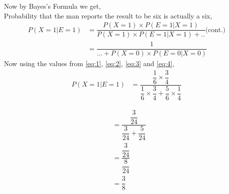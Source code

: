 \documentclass{beamer}
\begin{document}
\begin{frame}
Now by Bayes's Formula we get,\\
Probability that the man reports the result to be six is actually a six,\\
\begin{align}
P(X=1|E=1)&=\dfrac{P(X=1)\times P(E=1|X=1)}{P(X=1)\times P(E=1|X=1)+..}\text{(cont.)}\\
&=\dfrac{1}{...+P(X=0)\times P(E=0|X=0)}
\end{align}
Now using the values from \eqref{eq:1}, \eqref{eq:2}, \eqref{eq:3} and \eqref{eq:4},
\begin{align}
P(X=1|E=1)&=\dfrac{\dfrac{1}{6}\times \dfrac{3}{4}}{\dfrac{1}{6}\times \dfrac{3}{4}+\dfrac{5}{6}\times\dfrac{1}{4}}
\end{align}
\end{frame}


\begin{frame}
\begin{align}
&=\dfrac{\dfrac{3}{24}}{\dfrac{3}{24}+\dfrac{5}{24}}\\
&=\dfrac{\dfrac{3}{24}}{\dfrac{8}{24}}\\
&=\dfrac{3}{8}
\end{align}
\end{frame}
\end{document}
